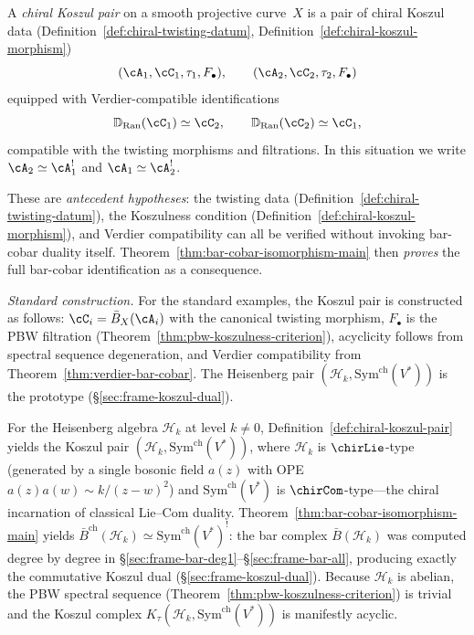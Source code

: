 \begin{definition}\label{def:chiral-koszul-pair}
A \emph{chiral Koszul pair} on a smooth projective curve~$X$
is a pair of chiral Koszul data
\textup{(}Definition~\textup{\ref{def:chiral-twisting-datum}},
Definition~\textup{\ref{def:chiral-koszul-morphism})}
\[
(\cA_1, \cC_1, \tau_1, F_\bullet), \qquad
(\cA_2, \cC_2, \tau_2, F_\bullet)
\]
equipped with Verdier-compatible identifications
\[
\mathbb{D}_{\operatorname{Ran}}(\cC_1) \simeq \cC_2, \qquad
\mathbb{D}_{\operatorname{Ran}}(\cC_2) \simeq \cC_1,
\]
compatible with the twisting morphisms and filtrations.
In this situation we write $\cA_2 \simeq \cA_1^!$ and
$\cA_1 \simeq \cA_2^!$.

\smallskip\noindent
These are \emph{antecedent hypotheses}: the twisting data
(Definition~\ref{def:chiral-twisting-datum}), the Koszulness
condition (Definition~\ref{def:chiral-koszul-morphism}),
and Verdier compatibility can all be verified without
invoking bar-cobar duality itself.
Theorem~\ref{thm:bar-cobar-isomorphism-main} then
\emph{proves} the full bar-cobar identification as a
consequence.

\smallskip\noindent
\emph{Standard construction.}
For the standard examples, the Koszul pair is constructed
as follows: $\cC_i = \bar{B}_X(\cA_i)$ with the canonical
twisting morphism, $F_\bullet$ is the PBW filtration
(Theorem~\ref{thm:pbw-koszulness-criterion}), acyclicity
follows from spectral sequence degeneration, and
Verdier compatibility from Theorem~\ref{thm:verdier-bar-cobar}.
The Heisenberg pair
$(\mathcal{H}_k, \mathrm{Sym}^{\mathrm{ch}}(V^*))$ is the
prototype (\S\ref{sec:frame-koszul-dual}).
\end{definition}


\begin{example}\label{ex:heisenberg-koszul-pair}
For the Heisenberg algebra $\mathcal{H}_k$ at level $k \neq 0$,
Definition~\ref{def:chiral-koszul-pair} yields the Koszul pair
$(\mathcal{H}_k, \mathrm{Sym}^{\mathrm{ch}}(V^*))$,
where $\mathcal{H}_k$ is $\chirLie$-type (generated by a single
bosonic field $a(z)$ with OPE $a(z)a(w) \sim k/(z-w)^2$)
and $\mathrm{Sym}^{\mathrm{ch}}(V^*)$ is $\chirCom$-type---the
chiral incarnation of classical $\mathrm{Lie}$--$\mathrm{Com}$ duality.
Theorem~\ref{thm:bar-cobar-isomorphism-main} yields
$\bar{B}^{\mathrm{ch}}(\mathcal{H}_k) \simeq
\mathrm{Sym}^{\mathrm{ch}}(V^*)^!$:
the bar complex $\bar{B}(\mathcal{H}_k)$ was computed degree by
degree in \S\ref{sec:frame-bar-deg1}--\S\ref{sec:frame-bar-all},
producing exactly the commutative Koszul dual
(\S\ref{sec:frame-koszul-dual}).
Because $\mathcal{H}_k$ is abelian, the PBW spectral sequence
(Theorem~\ref{thm:pbw-koszulness-criterion}) is trivial and the
Koszul complex $K_\tau(\mathcal{H}_k,
\mathrm{Sym}^{\mathrm{ch}}(V^*))$ is manifestly acyclic.
\end{example}

